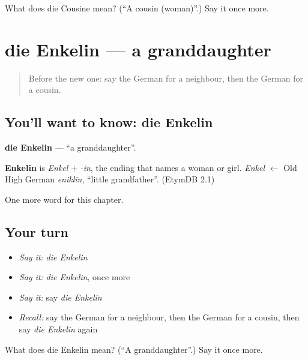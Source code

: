 \begin{tcolorbox}[breakable,colback=teal!4,colframe=teal!35!black,title={Before you move on}]
What does die Cousine mean? (\textquotedblleft{}A cousin (woman)\textquotedblright{}.) Say it once more.
\end{tcolorbox}
\section[die Enkelin]{die Enkelin — a granddaughter}

\label{lesson:GE-C164-enkelin}



\begin{quote}
Before the new one: say the German for a neighbour, then the German for a cousin.
\end{quote}

\subsection*{You'll want to know: die Enkelin}
\textbf{die Enkelin} — \textquotedblleft{}a granddaughter\textquotedblright{}.

\begin{cousinweb}
\textbf{Enkelin} is \emph{Enkel} + \emph{-in}, the ending that names a woman or girl. \emph{Enkel} $\leftarrow$ Old High German \emph{eniklīn}, \textquotedblleft{}little grandfather\textquotedblright{}. (EtymDB 2.1)
\end{cousinweb}

\begin{grammarlens}[title={What you've built}]
One more word for this chapter.
\end{grammarlens}

\subsection*{Your turn}
\begin{itemize}
\raggedright
  \item \emph{Say it:} \emph{die Enkelin}
  \item \emph{Say it:} \emph{die Enkelin}, once more
  \item \emph{Say it:} say \emph{die Enkelin}
  \item \emph{Recall:} say the German for a neighbour, then the German for a cousin, then say \emph{die Enkelin} again
\end{itemize}

\begin{tcolorbox}[breakable,colback=teal!4,colframe=teal!35!black,title={Before you move on}]
What does die Enkelin mean? (\textquotedblleft{}A granddaughter\textquotedblright{}.) Say it once more.
\end{tcolorbox}
